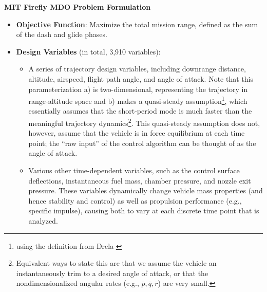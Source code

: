 \begin{example}
    \textbf{MIT Firefly MDO Problem Formulation}

    \begin{itemize}
        \item \textbf{Objective Function}: Maximize the total mission range, defined as the sum of the dash and glide phases.

        \item \textbf{Design Variables} (in total, 3,910 variables):
        \begin{itemize}
            \item A series of trajectory design variables, including downrange distance, altitude, airspeed, flight path angle, and angle of attack. Note that this parameterization a) is two-dimensional, representing the trajectory in range-altitude space and b) makes a quasi-steady assumption\footnote{using the definition from Drela \cite{drela_flight_2013}}, which essentially assumes that the short-period mode is much faster than the meaningful trajectory dynamics\footnote{Equivalent ways to state this are that we assume the vehicle an instantaneously trim to a desired angle of attack, or that the nondimensionalized angular rates (e.g., $\bar{p}, \bar{q}, \bar{r}$) are very small.}. This quasi-steady assumption does not, however, assume that the vehicle is in force equilibrium at each time point; the ``raw input'' of the control algorithm can be thought of as the angle of attack.

            \item Various other time-dependent variables, such as the control surface deflections, instantaneous fuel mass, chamber pressure, and nozzle exit pressure. These variables dynamically change vehicle mass properties (and hence stability and control) as well as propulsion performance (e.g., specific impulse), causing both to vary at each discrete time point that is analyzed.


\end{itemize}
\end{itemize}
\end{example}
